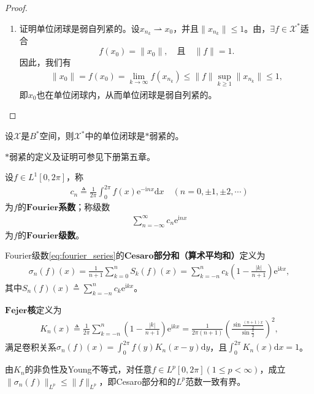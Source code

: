 \documentclass[../../main.tex]{subfiles}%
\begin{document}
\begin{proof}
\begin{enumerate}[(1)]
\item 证明单位闭球是弱自列紧的。设$x_{n_k}\rightharpoonup x_0$，并且$\|x_{n_k}\|\leqslant1$。由，$\exists f\in\mathscr{X}^*$适合
$$f(x_0)=\|x_0\|,\quad\text{且}\quad\|f\|=1.$$
因此，我们有
\begin{align*}
\|x_0\|=f(x_0)=\lim\limits_{k\to\infty}f(x_{n_k})\leqslant\|f\|\sup\limits_{k\geqslant1}\|x_{n_k}\|\leqslant1,
\end{align*}
即$x_0$也在单位闭球内，从而单位闭球是弱自列紧的。
\end{enumerate}
\end{proof}

\begin{theorem}[Alaoglu定理]
设$\mathscr{X}$是$B^*$空间，则$\mathscr{X}^*$中的单位闭球是$*$弱紧的。
\end{theorem}
\begin{remark}
$*$弱紧的定义及证明可参见下册第五章。
\end{remark}

\begin{definition}
设$f\in L^1[0,2\pi]$，称
\begin{align*}
c_n\triangleq\frac{1}{2\pi}\int_{0}^{2\pi}f(x)\mathrm{e}^{-\mathrm{i}nx}\mathrm{d}x\quad(n=0,\pm1,\pm2,\cdots)
\end{align*}
为$f$的$\mathbf{Fourier}$\textbf{系数}；称级数
\begin{align}
\sum\limits_{n=-\infty}^{\infty}c_n\mathrm{e}^{\mathrm{i}nx}\label{eq:fourier_series}
\end{align}
为$f$的$\mathbf{Fourier}$\textbf{级数}。
\end{definition}

\begin{definition}
Fourier级数\eqref{eq:fourier_series}的$\mathbf{Cesaro}$\textbf{部分和（算术平均和）}定义为
\begin{align}
\sigma_n(f)(x)=\frac{1}{n+1}\sum\limits_{k=0}^{n}S_k(f)(x)
=\sum\limits_{k=-n}^{n}c_k\left(1-\frac{|k|}{n+1}\right)\mathrm{e}^{\mathrm{i}kx},\label{eq:cesaro_sum}
\end{align}
其中$S_n(f)(x)\triangleq\sum\limits_{k=-n}^{n}c_k\mathrm{e}^{\mathrm{i}kx}$。
\end{definition}

\begin{definition}[Fejer核]
$\mathbf{Fejer}$\textbf{核}定义为
\begin{align*}
K_n(x)\triangleq\frac{1}{2\pi}\sum\limits_{k=-n}^{n}\left(1-\frac{|k|}{n+1}\right)\mathrm{e}^{\mathrm{i}kx}
=\frac{1}{2\pi(n+1)}\left(\frac{\sin\frac{(n+1)x}{2}}{\sin\frac{x}{2}}\right)^2,
\end{align*}
满足卷积关系$\sigma_n(f)(x)=\int_{0}^{2\pi}f(y)K_n(x-y)\mathrm{d}y$，且$\int_{0}^{2\pi}K_n(x)\mathrm{d}x=1$。
\end{definition}
\begin{remark}
由$K_n$的非负性及Young不等式，对任意$f\in L^p[0,2\pi](1\leqslant p<\infty)$，成立$\|\sigma_n(f)\|_{L^p}\leqslant\|f\|_{L^p}$，即Cesaro部分和的$L^p$范数一致有界。
\end{remark}
\end{document}
